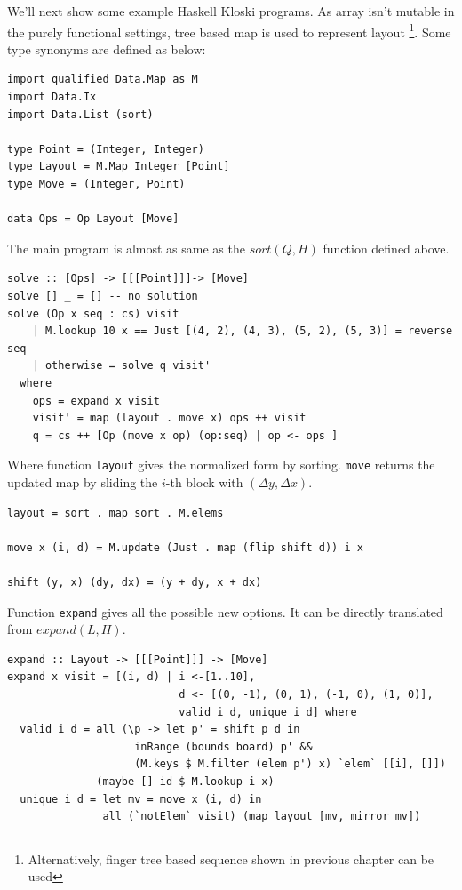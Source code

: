 \documentclass[UTF8]{article}
\begin{document}
We'll next show some example Haskell Kloski programs. As array isn't mutable in
the purely functional settings, tree based map is used to represent layout
\footnote{Alternatively, finger tree based sequence shown in previous chapter
can be used}. Some type synonyms are defined as below:

\lstset{language=Haskell}
\begin{lstlisting}
import qualified Data.Map as M
import Data.Ix
import Data.List (sort)

type Point = (Integer, Integer)
type Layout = M.Map Integer [Point]
type Move = (Integer, Point)

data Ops = Op Layout [Move]
\end{lstlisting}

The main program is almost as same as the $sort(Q, H)$ function defined above.

\lstset{language=Haskell}
\begin{lstlisting}
solve :: [Ops] -> [[[Point]]]-> [Move]
solve [] _ = [] -- no solution
solve (Op x seq : cs) visit
    | M.lookup 10 x == Just [(4, 2), (4, 3), (5, 2), (5, 3)] = reverse seq
    | otherwise = solve q visit'
  where
    ops = expand x visit
    visit' = map (layout . move x) ops ++ visit
    q = cs ++ [Op (move x op) (op:seq) | op <- ops ]
\end{lstlisting}

Where function \texttt{layout} gives the normalized form by sorting. \texttt{move} returns
the updated map by sliding the $i$-th block with $(\Delta y, \Delta x)$.

\lstset{language=Haskell}
\begin{lstlisting}
layout = sort . map sort . M.elems

move x (i, d) = M.update (Just . map (flip shift d)) i x

shift (y, x) (dy, dx) = (y + dy, x + dx)
\end{lstlisting}

Function \texttt{expand} gives all the possible new options. It can be directly translated
from $expand(L, H)$.

\lstset{language=Haskell}
\begin{lstlisting}
expand :: Layout -> [[[Point]]] -> [Move]
expand x visit = [(i, d) | i <-[1..10],
                           d <- [(0, -1), (0, 1), (-1, 0), (1, 0)],
                           valid i d, unique i d] where
  valid i d = all (\p -> let p' = shift p d in
                    inRange (bounds board) p' &&
                    (M.keys $ M.filter (elem p') x) `elem` [[i], []])
              (maybe [] id $ M.lookup i x)
  unique i d = let mv = move x (i, d) in
               all (`notElem` visit) (map layout [mv, mirror mv])
\end{lstlisting}
\end{document}
